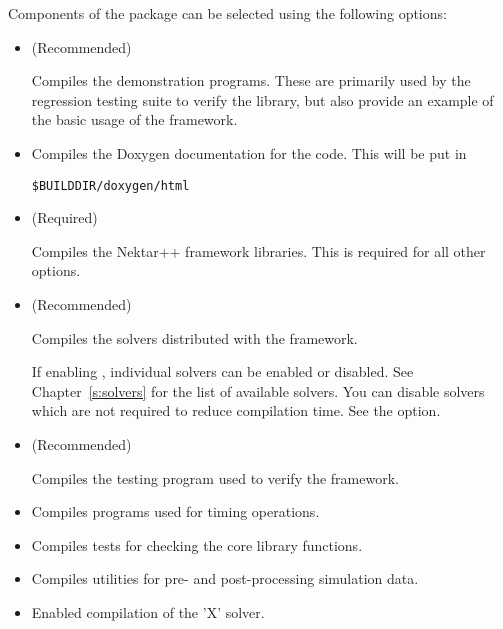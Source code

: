Components of the \nekpp package can be selected using the following options:
\begin{itemize}
    \item {} (Recommended)
    
    Compiles the demonstration programs. These are primarily used by the
    regression testing suite to verify the \nekpp library, but also provide an
    example of the basic usage of the framework.

    \item {}

    Compiles the Doxygen documentation for the code. This will be put in
    \begin{lstlisting}[style=BashInputStyle]
    $BUILDDIR/doxygen/html
    \end{lstlisting}

    \item {} (Required)
    
    Compiles the Nektar++ framework libraries. This is required for all other
    options.

    \item {} (Recommended)
    
    Compiles the solvers distributed with the \nekpp framework.

    If enabling , individual solvers can be
    enabled or disabled. See Chapter~\ref{s:solvers} for the list of available
    solvers. You can disable solvers which are not required to reduce
    compilation time. See the  option.

    \item {} (Recommended)

    Compiles the testing program used to verify the \nekpp framework.

    \item {}

    Compiles programs used for timing \nekpp operations.

    \item {}

    Compiles tests for checking the core library functions.

    \item {}

    Compiles utilities for pre- and post-processing simulation data.
    
    \item {}
    
    Enabled compilation of the 'X' solver.
\end{itemize}

